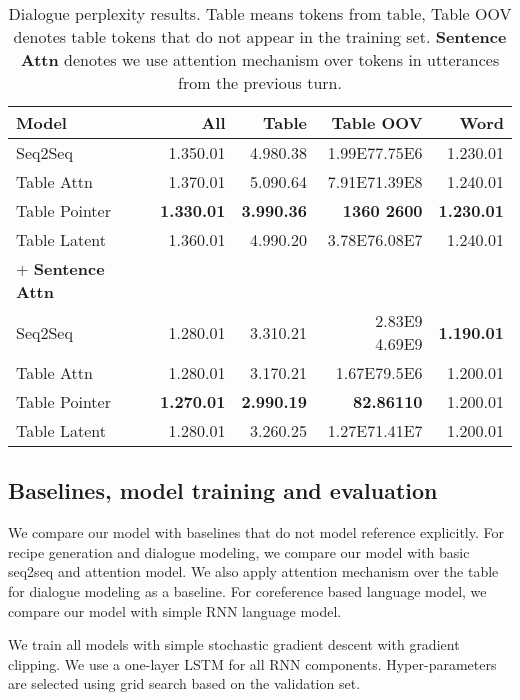 \documentclass[11pt,letterpaper]{article}
\begin{document}
\begin{table*}[!thbp]
\begin{small}
\centering
\begin{tabular}{l r r r r}
  \toprule
  Model & All & Table & Table OOV & Word \\
  \midrule
  Seq2Seq & 1.350.01 & 4.980.38 & 1.99E77.75E6 & 1.230.01 \\
  Table Attn & 1.370.01 & 5.090.64 & 7.91E71.39E8 & 1.240.01 \\
  Table Pointer & {\bf 1.330.01} & {\bf 3.990.36} & {\bf 1360  2600} & {\bf 1.230.01} \\
  Table Latent & 1.360.01 & 4.990.20 & 3.78E76.08E7 & 1.240.01 \\
  \midrule
  + {\bf Sentence Attn} \\
  Seq2Seq & 1.280.01 & 3.310.21 & 2.83E9  4.69E9 & {\bf 1.190.01} \\
  Table Attn & 1.280.01 & 3.170.21 & 1.67E79.5E6 & 1.200.01 \\
  Table Pointer & {\bf 1.270.01} & {\bf 2.990.19} & {\bf 82.86110} & 1.200.01 \\
  Table Latent & 1.280.01 & 3.260.25 & 1.27E71.41E7 & 1.200.01 \\
  \bottomrule
\end{tabular}
\caption{Dialogue perplexity results. Table means tokens
  from table, Table OOV denotes table tokens that do not appear in the
  training set. {\bf Sentence Attn} denotes we
  use attention mechanism over tokens in utterances from the previous
  turn. }
\label{tab:dialogue}
\vspace{-0.3cm}
\end{small}
\end{table*}



\subsection{Baselines, model training and evaluation}
We compare our model with baselines that do not model reference explicitly. 
For recipe generation and dialogue modeling, we compare our model with basic seq2seq and 
attention model. We also apply attention mechanism over the table for dialogue modeling as a baseline.
For coreference based language model, we compare our model with
simple RNN language model.

We train all models with simple stochastic gradient descent with gradient
clipping. We use a one-layer LSTM for all RNN components. Hyper-parameters are
selected using grid search based on the validation set.
\end{document}
